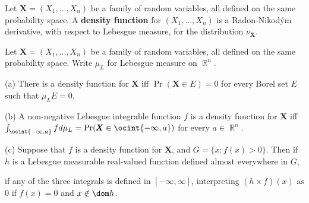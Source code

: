  Let $\pmb{X}=(X_1,\ldots,X_n)$ be a family of
random
variables, all defined on the same probability space.   A {\bf density
function}
for $(X_1,\ldots,X_n)$ is a Radon-Nikod\'ym derivative, with respect to
Lebesgue measure, for the distribution
$\nu_{\pmb{X}}$.

 Let $\pmb{X}=(X_1,\ldots,X_n)$ be a family of
random variables, all defined on the same probability space.   Write
$\mu_L$ for Lebesgue measure on $\BbbR^n$.

(a) There is a density function for $\pmb{X}$ iff $\Pr(\pmb{X}\in E)=0$
for every Borel set $E$ such that $\mu_LE=0$.

(b) A non-negative Lebesgue integrable function $f$ is a density
function for $\pmb{X}$ iff
$\int_{\ocint{-\infty,a}}fd\mu_L=\Pr(\pmb{X}\in\ocint{-\infty,a})$ for
every $a\in\BbbR^n$.

(c) Suppose that $f$ is a density function for $\pmb{X}$, and
$G=\{x:f(x)>0\}$.
Then if $h$ is a Lebesgue measurable real-valued function defined almost
everywhere in $G$,


\noindent if any of the three integrals is defined in
$[-\infty,\infty]$, interpreting $(h\times f)(x)$ as $0$ if $f(x)=0$ and
$x\notin\dom h$.

